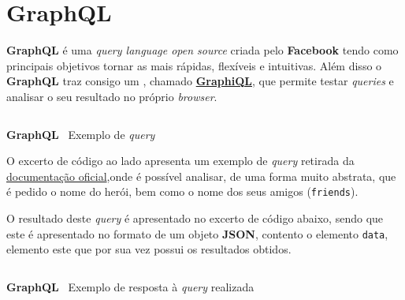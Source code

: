 \section{GraphQL}

\begin{minipage}[t]{.3\textwidth}
\end{minipage}
\begin{minipage}[t]{.7\textwidth}
	\minipagerestore
	\textbf{GraphQL} é uma \textit{query language open source} criada pelo \textbf{Facebook} tendo como principais objetivos tornar as  mais rápidas, flexíveis e intuitivas. Além disso o \textbf{GraphQL} traz consigo um , chamado \textbf{\href{https://github.com/graphql/graphiql}{GraphiQL}}, que permite testar \textit{queries} e analisar o seu resultado no próprio \textit{browser}.
\end{minipage}

\begin{minipage}[t]{.45\textwidth}
	\begin{longlisting}
		\inputminted{text}{code/graphql/example-query.graphql}
		\caption{\textbf{GraphQL} \textemdash~Exemplo de \textit{query}}
	\end{longlisting}
\end{minipage}
\begin{minipage}[t]{.55\textwidth}
	\minipagerestore
	O excerto de código ao lado apresenta um exemplo de \textit{query} retirada da \href{https://graphql.org/learn/queries/}{documentação oficial},onde é possível analisar, de uma forma muito abstrata, que é pedido o nome do herói, bem como o nome dos seus amigos (\texttt{friends}).

	O resultado deste \textit{query} é apresentado no excerto de código abaixo, sendo que este é apresentado no formato de um objeto \textbf{JSON}, contento o elemento \texttt{data}, elemento este que por sua vez possui os resultados obtidos.
\end{minipage}

\begin{longlisting}
	\inputminted{json}{code/graphql/example-result.json}
	\caption{\textbf{GraphQL} \textemdash~Exemplo de resposta à \textit{query} realizada}
\end{longlisting}